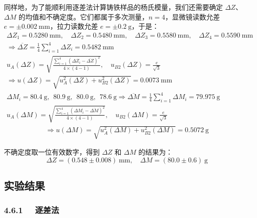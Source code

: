 \documentclass[UTF8]{article}
\theoremstyle{MyLineTheoremStyle} %
\theoremstyle{MyBlockTheoremStyle} %
\theoremstyle{MySubsubsectionStyle} %
\begin{document}
同样地，为了能顺利用逐差法计算铸铁样品的杨氏模量，我们还需要确定 $\Delta Z$、$\Delta M$ 的均值和不确定度。它们都属于多次测量，$n = 4$，显微镜读数允差 $e = \pm 0.002 \ \mathrm{mm}$，拉力读数允差 $e = \pm 0.2 \ \mathrm{g}$，于是：
\begin{gather}
\Delta Z_1 = 0.5280 \ \mathrm{mm},\quad \Delta Z_2 = 0.5480\ \mathrm{mm},\quad \Delta Z_3 = 0.5580 \ \mathrm{mm},\quad \Delta Z_4 = 0.5590 \ \mathrm{mm} \\ 
\Longrightarrow
\overline{\Delta Z} = \frac{1}{4}\sum_{i=1}^{4}\Delta Z_i = 0.5482 \ \mathrm{mm} \\ 
u_A(\Delta Z) = \sqrt{\frac{\sum_{i=1}^{4}\left(\Delta Z_i - \overline{\Delta Z}\right)^2}{4\times (4 - 1)}} ,\quad u_{B2}(\Delta Z) =  \frac{e}{\sqrt{3}} \\ 
\Longrightarrow u(\Delta Z) = \sqrt{u_A^2(\Delta Z) + u_{B2}^2(\Delta Z)} = 0.0073 \ \mathrm{mm} 
\\ 
\Delta M_i = 80.4 \ \mathrm{g},\ \  80.9 \ \mathrm{g},\ \  80.0 \ \mathrm{g},\ \  78.6\ \mathrm{g} 
\Longrightarrow
\overline{\Delta M} = \frac{1}{4}\sum_{i=1}^{4}\Delta M_i = 79.975 \ \mathrm{g} \\ 
u_A(\Delta M) = \sqrt{\frac{\sum_{i=1}^{4}\left(\Delta M_i - \overline{\Delta M}\right)^2}{4\times (4 - 1)}} ,\quad u_{B2}(\Delta M) =  \frac{e}{\sqrt{3}}
\end{gather}
\begin{gather}
    \Longrightarrow u(\Delta M) = \sqrt{u_A^2(\Delta M) + u_{B2}^2(\Delta M)} = 0.5072 \ \mathrm{g}
\end{gather}

不确定度取一位有效数字，得到 $\Delta Z$ 和 $\Delta M$ 的结果为：
\begin{equation}
    \Delta Z = (0.548 \pm 0.008) \ \mathrm{mm},\quad
    \Delta M = (80.0 \pm 0.6) \ \mathrm{g}
\end{equation}

\subsection{实验结果}

\subsubsection*{4.6.1 \ \ 逐差法}
\end{document}

